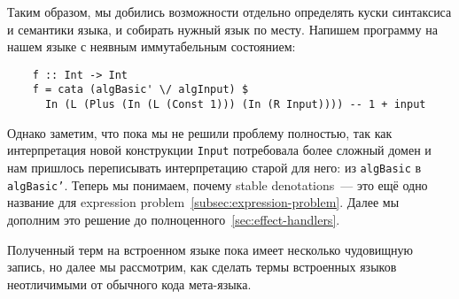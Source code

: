 Таким образом, мы добились возможности отдельно определять куски синтаксиса и семантики языка, и собирать нужный язык по месту.
Напишем программу на нашем языке с неявным иммутабельным состоянием:
\begin{verbatim}
    f :: Int -> Int
    f = cata (algBasic' \/ algInput) $
      In (L (Plus (In (L (Const 1))) (In (R Input)))) -- 1 + input
\end{verbatim}

Однако заметим, что пока мы не решили проблему полностью, так как интерпретация новой конструкции \texttt{Input} потребовала более сложный домен и нам пришлось переписывать интерпретацию старой для него: из \texttt{algBasic} в \texttt{algBasic'}.
Теперь мы понимаем, почему stable denotations~--- это ещё одно название для expression problem~\ref{subsec:expression-problem}.
Далее мы дополним это решение до полноценного~\ref{sec:effect-handlers}.

Полученный терм на встроенном языке пока имеет несколько чудовищную запись, но далее мы рассмотрим, как сделать термы встроенных языков неотличимыми от обычного кода мета-языка.
